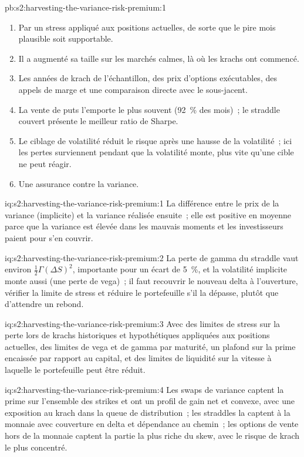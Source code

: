 \begin{solution}{pb:s2:harvesting-the-variance-risk-premium:1}
\begin{enumerate}
\item Par un stress appliqué aux positions actuelles, de sorte que le pire mois plausible soit supportable.
\item Il a augmenté sa taille sur les marchés calmes, là où les krachs ont commencé.
\item Les années de krach de l'échantillon, des prix d'options exécutables, des appels de marge et une comparaison directe avec le sous-jacent.
\item La vente de puts l'emporte le plus souvent (92~\% des mois)~; le straddle couvert présente le meilleur ratio de Sharpe.
\item Le ciblage de volatilité réduit le risque après une hausse de la volatilité~; ici les pertes surviennent pendant que la volatilité monte, plus vite qu'une cible ne peut réagir.
\item Une assurance contre la variance.
\end{enumerate}
\end{solution}

\begin{solution}{iq:s2:harvesting-the-variance-risk-premium:1}
La différence entre le prix de la variance (implicite) et la variance réalisée ensuite~; elle est positive en moyenne parce que la variance est élevée dans les mauvais moments
et les investisseurs paient pour s'en couvrir.
\end{solution}

\begin{solution}{iq:s2:harvesting-the-variance-risk-premium:2}
La perte de gamma du straddle vaut environ $\tfrac12\Gamma(\Delta S)^2$, importante pour un écart de 5~\%, et la volatilité implicite monte aussi (une perte de vega)~; il faut recouvrir le nouveau
delta à l'ouverture, vérifier la limite de stress et réduire le portefeuille s'il la dépasse, plutôt que d'attendre un rebond.
\end{solution}

\begin{solution}{iq:s2:harvesting-the-variance-risk-premium:3}
Avec des limites de stress sur la perte lors de krachs historiques et hypothétiques appliquées aux positions actuelles, des limites de vega et de gamma par maturité, un plafond sur la
prime encaissée par rapport au capital, et des limites de liquidité sur la vitesse à laquelle le portefeuille peut être réduit.
\end{solution}

\begin{solution}{iq:s2:harvesting-the-variance-risk-premium:4}
Les swaps de variance captent la prime sur l'ensemble des strikes et ont un profil de gain net et convexe, avec une exposition au krach dans la queue de distribution~; les straddles la captent à la monnaie
avec couverture en delta et dépendance au chemin~; les options de vente hors de la monnaie captent la partie la plus riche du skew, avec le risque de krach le plus concentré.
\end{solution}


